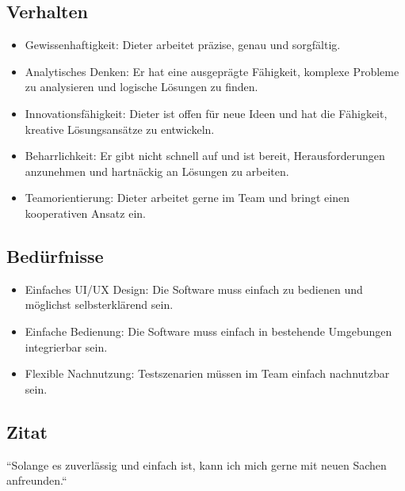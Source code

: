 \subsection*{Verhalten}
\begin{itemize}
    \item Gewissenhaftigkeit: Dieter arbeitet präzise, genau und sorgfältig.
    \item Analytisches Denken: Er hat eine ausgeprägte Fähigkeit, komplexe Probleme zu analysieren und logische Lösungen zu finden.
    \item Innovationsfähigkeit: Dieter ist offen für neue Ideen und hat die Fähigkeit, kreative Lösungsansätze zu entwickeln.
    \item Beharrlichkeit: Er gibt nicht schnell auf und ist bereit, Herausforderungen anzunehmen und hartnäckig an Lösungen zu arbeiten.
    \item Teamorientierung: Dieter arbeitet gerne im Team und bringt einen kooperativen Ansatz ein.
\end{itemize}

\subsection*{Bedürfnisse}
\begin{itemize}
    \item Einfaches UI/UX Design: Die Software muss einfach zu bedienen und möglichst selbsterklärend sein.
    \item Einfache Bedienung: Die Software muss einfach in bestehende Umgebungen integrierbar sein.
    \item Flexible Nachnutzung: Testszenarien müssen im Team einfach nachnutzbar sein.
\end{itemize}

\subsection*{Zitat}
``Solange es zuverlässig und einfach ist, kann ich mich gerne mit neuen Sachen anfreunden.``
